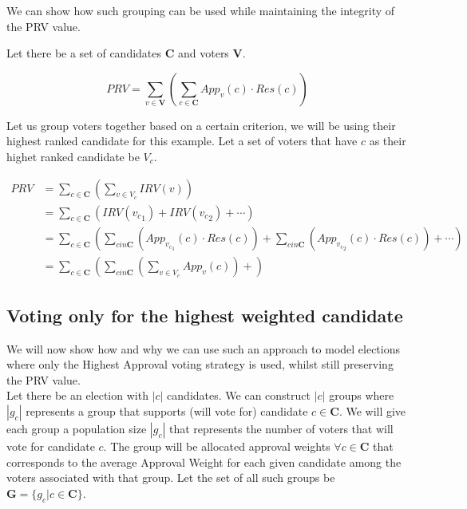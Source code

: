 \documentclass{article}
\begin{document}
We can show how such grouping can be used while maintaining the integrity of the PRV value.

Let there be a set of candidates $\boldsymbol{C}$ and voters $\boldsymbol{V}$.

\begin{equation*}
    PRV = \sum^{}_{v \in \boldsymbol{V}}{\left(\sum^{}_{c \in \boldsymbol{C}}{{App}_v(c) \cdot {Res}(c)}\right)}
\end{equation*}

Let us group voters together based on a certain criterion, we will be using their highest ranked candidate for this example.
Let a set of voters that have $c$ as their highet ranked candidate be $V_c$.

\begin{equation*}
\begin{aligned}
PRV &= \sum^{}_{c \in \boldsymbol{C}}{\left(\sum^{}_{v \in V_c}{{IRV}(v)}\right)}\\
&= \sum^{}_{c \in \boldsymbol{C}}{\left({IRV}({v_c}_1)+{IRV}({v_c}_2)+\cdots\right)}\\
&= \sum^{}_{c \in \boldsymbol{C}}{\left(\sum^{}_{c in \boldsymbol{C}}{\left({App}_{{v_c}_1}(c)\cdot Res(c)\right)}+\sum^{}_{c in \boldsymbol{C}}{\left({App}_{{v_c}_2}(c)\cdot Res(c)\right)}+\cdots\right)}\\
&= \sum^{}_{c \in \boldsymbol{C}}{\left(\sum^{}_{c in \boldsymbol{C}}{\left(\sum^{}_{v \in V_c}{{App}_{v}(c)}\right)}+\right)}
\end{aligned}    
\end{equation*}


\subsection{Voting only for the highest weighted candidate}
We will now show how and why we can use such an approach to model elections where only the Highest Approval voting strategy is used, whilst still preserving the PRV value.\\

Let there be an election with $|c|$ candidates. We can construct $|c|$ groups where $|g_c|$ represents a group that supports (will vote for) candidate $c \in \boldsymbol{C}$. We will give each group a population size $|g_c|$ that represents the number of voters that will vote for candidate $c$. The group will be allocated approval weights $\forall c \in \boldsymbol{C}$ that corresponds to the average Approval Weight for each given candidate among the voters associated with that group. Let the set of all such groups be $\boldsymbol{G} = \{g_c | c \in \boldsymbol{C}\}$.
\end{document}
